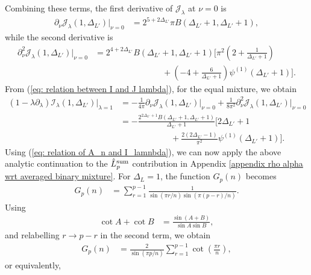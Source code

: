 \documentclass[11pt]{article}
\newcommand{\p}{\partial}
\newcommand{\nn}{\nonumber}
\newcommand{\lb}{\left(}
\newcommand{\rb}{\right)}
\begin{document}
Combining these terms, the first derivative of $\mathcal{J}_\lambda$ at $\nu=0$ is
\begin{align}\label{eq: del nu J lambda in terms of Beta function}
    \p_\nu \mathcal{J}_\lambda(1,\Delta_{L'})\Big|_{\nu=0}
    &=
    2^{5+2\Delta_{L'}}\pi
    B(\Delta_{L'}+1,\Delta_{L'}+1),
\end{align}
while the second derivative is
\begin{align}
    \p_\nu^2 \mathcal{J}_\lambda(1,\Delta_{L'})\Big|_{\nu=0}
    &=
    2^{4+2\Delta_{L'}}
    B(\Delta_{L'}+1,\Delta_{L'}+1)
    \Bigg[
    \pi^2\lb
    2+\frac{1}{\Delta_{L'}+1}
    \rb
    \nn\\
    &\qquad\qquad\qquad\qquad
    +
    \lb
    -4+\frac{6}{\Delta_{L'}+1}
    \rb
    \psi^{(1)}(\Delta_{L'}+1)
    \Bigg].
\end{align}
From (\ref{eq: relation between I and J lambda}), for the equal mixture, we obtain
\begin{align}
    \lb
    1-\lambda\p_\lambda
    \rb
    \mathcal{I}_\lambda(1,\Delta_{L'})
    \Big|_{\lambda=1}
    &=
    -\frac{1}{4\pi}
    \p_\nu\mathcal{J}_\lambda(1,\Delta_{L'})
    \Big|_{\nu=0}
    +
    \frac{1}{8\pi^2}
    \p_\nu^2\mathcal{J}_\lambda(1,\Delta_{L'})
    \Big|_{\nu=0}
    \\
    &=
    -\frac{
    2^{2\Delta_{L'}+1}
    B(\Delta_{L'}+1,\Delta_{L'}+1)
    }{\Delta_{L'}+1}
    \Bigg[
    2\Delta_{L'}+1
    \nn\\
    &\qquad\qquad\qquad
    +
    \frac{2(2\Delta_{L'}-1)}{\pi^2}
    \psi^{(1)}(\Delta_{L'}+1)
    \Bigg].
\end{align}
Using (\ref{eq: relation of A_n and I_lamnbda}),
we can now apply the above analytic continuation to the
$\hat L_p^{\rm sum}$ contribution in Appendix
\ref{appendix rho alpha wrt averaged binary mixture}.
For $\Delta_L=1$, the function $G_p(n)$ becomes
\begin{align}
    G_p(n)
    &=
    \sum_{r=1}^{p-1}
    \frac{1}{
    \sin(\pi r/n)
    \sin(\pi(p-r)/n)
    }.
\end{align}
Using
\begin{align}
    \cot A+\cot B
    &=
    \frac{\sin(A+B)}{\sin A\sin B},
\end{align}
and relabelling $r\rightarrow p-r$ in the second term, we obtain
\begin{align}\label{eq: Gp(n) identity}
    G_p(n)
    &=
    \frac{2}{\sin(\pi p/n)}
    \sum_{r=1}^{p-1}\cot\lb\frac{\pi r}{n}\rb ,
\end{align}
or equivalently,
\end{document}
